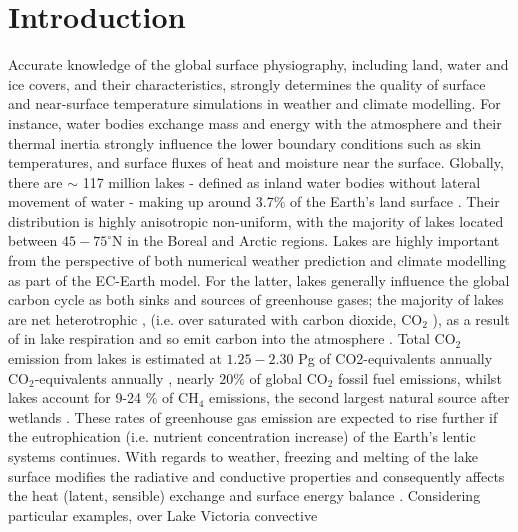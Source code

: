\documentclass[hess, twostagejnl]{copernicus}
\providecommand{\DIFadd}[1]{{\protect\color{blue} \sf #1}} %
\providecommand{\DIFdel}[1]{{\protect\color{red} \scriptsize #1}} %
\providecommand{\DIFaddbegin}{} %
\providecommand{\DIFaddend}{} %
\providecommand{\DIFdelbegin}{} %
\providecommand{\DIFdelend}{} %
\begin{document}

\DIFaddbegin 


\DIFaddend \section{Introduction}
\DIFaddbegin \DIFadd{Accurate knowledge of the global surface physiography, including land, water and ice covers, and their characteristics, strongly determines the quality of surface and near-surface temperature simulations in weather and climate modelling. For instance, water bodies exchange mass and energy with the atmosphere and their thermal inertia strongly influence the lower boundary conditions such as skin temperatures, and surface fluxes of heat and moisture near the surface. }\DIFaddend Globally, there are $\sim$ 117 million lakes - defined as inland water bodies without lateral movement of water - making up around 3.7$\%$ of the Earth's land surface \DIFdelbegin \DIFdel{\cite{Verpoorter2014}}\DIFdelend \DIFaddbegin \DIFadd{\citep{Verpoorter2014}}\DIFaddend . Their distribution is highly \DIFdelbegin \DIFdel{anisotropic}\DIFdelend \DIFaddbegin \DIFadd{non-uniform}\DIFaddend , with the majority of lakes located between $45-75^{\circ}$N in the Boreal and Arctic regions. Lakes are highly important from the perspective of both numerical weather prediction and climate modelling \DIFaddbegin \DIFadd{as part of the EC-Earth model}\DIFaddend . For the latter, lakes generally influence the global carbon cycle as both sinks and sources of greenhouse gases; the majority of lakes are net heterotrophic \DIFdelbegin \DIFdel{, }\DIFdelend \DIFaddbegin \DIFadd{(i.e. }\DIFaddend over saturated with \DIFaddbegin \DIFadd{carbon dioxide, }\DIFaddend CO$_2$\DIFaddbegin \DIFadd{), }\DIFaddend as a result of in lake respiration and so emit carbon into the atmosphere \DIFdelbegin \DIFdel{\cite{Pace2005,Tranvik2009}}\DIFdelend \DIFaddbegin \DIFadd{\citep{Pace2005,Tranvik2009}}\DIFaddend .  Total CO$_2$ emission from lakes is estimated at $1.25 - 2.30$ Pg of \DIFdelbegin \DIFdel{CO2-equivalents annually \cite{DelSontro2018}}\DIFdelend \DIFaddbegin \DIFadd{CO$_2$-equivalents annually \citep{DelSontro2018}}\DIFaddend , nearly $20 \%$ of global CO$_2$ fossil fuel emissions, whilst lakes account for 9-24 $\%$  of CH$_4$ emissions, the second largest natural source after wetlands \DIFdelbegin \DIFdel{\cite{Saunois2020}}\DIFdelend \DIFaddbegin \DIFadd{\citep{Saunois2020}}\DIFaddend . These rates of greenhouse gas emission are expected to rise further if the eutrophication \DIFaddbegin \DIFadd{(i.e. nutrient concentration increase) }\DIFaddend of the Earth's lentic systems continues. With regards to weather, freezing and melting of the lake surface modifies the radiative and conductive properties and consequently affects the heat (latent, sensible) exchange and surface energy balance \DIFdelbegin \DIFdel{\cite{Huang2019,Peng2020,Franz2018}}\DIFdelend \DIFaddbegin \DIFadd{\citep{Franz2018,Huang2019,Peng2020}}\DIFaddend . Considering particular examples, over Lake Victoria convective 
\end{document}
